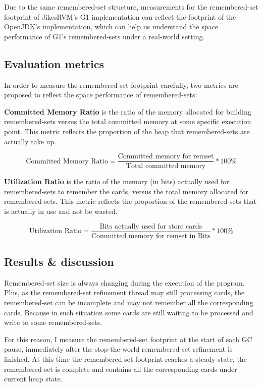Due to the same remembered-set structure,
measurements for the remembered-set footprint of JikesRVM's G1 implementation can reflect
the footprint of the OpenJDK's implementation, which can help us understand the
space performance of G1's remembered-sets under a real-world setting.

\subsection{Evaluation metrics}

In order to measure the remembered-set footprint carefully, two metrics are proposed
to reflect the space performance of remembered-sets:

\textbf{Committed Memory Ratio} is the ratio of the memory allocated for building remembered-sets
versus the total committed memory at some specific execution point.
This metric reflects the proportion of the heap that remembered-sets are actually take up.

$$ \text{Committed Memory Ratio} = \frac{\text{Committed memory for remset}}{\text{Total committed memory}} * 100\% $$

\textbf{Utilization Ratio} is the ratio of the memory (in bits) actually used for
remembered-sets to remember the cards, versus the total memory allocated for remembered-sets.
This metric reflects the proportion of the remembered-sets that is actually in use
and not be wasted.

$$ \text{Utilization Ratio} = \frac{\text{Bits actually used for store cards}}{\text{Committed memory for remset in Bits}} * 100\% $$

\subsection{Results \& discussion}

Remembered-set size is always changing during the execution of the program.
Plus, as the remembered-set refinement thread may still processing cards,
the remembered-set can be incomplete and may not remember all the corresponding cards.
Because in such situation some cards are still waiting to
be processed and write to some remembered-sets.

For this reason, I measure the remembered-set footprint at the start of each GC pause, immediately after
the stop-the-world remembered-set refinement is finished. At this time the remembered-set
footprint reaches a steady state, the remembered-set is complete and contains
all the corresponding cards under current heap state.

